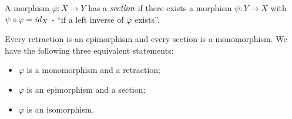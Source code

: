 \documentclass[10pt, oneside, reqno]{amsart}
\begin{document}
\begin{defn}[Section]
 A morphism $\varphi: X \to Y$ has a $\emph{section}$ if there exists a morphism $\psi: Y \to X$ with $\psi \circ \varphi = \mathit{id}_{X}$ - ``if a left inverse of $\varphi$ exists''.
\end{defn}

\begin{lem}
Every retraction is an epimorphism and every section is a monomorphism.
We have the following three equivalent statements:
\begin{itemize}
\item $\varphi$ is a monomorphism and a retraction;
\item $\varphi$ is an epimorphism and a section;
\item $\varphi$ is an isomorphism.
\end{itemize}
\end{lem}
\end{document}
